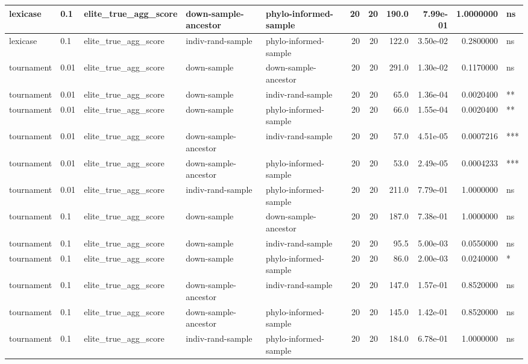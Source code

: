 \documentclass[
]{book}
\begin{document}
\begin{tabular}{l|l|l|l|l|r|r|r|r|r|l}
\hline
lexicase & 0.1 & elite\_true\_agg\_score & down-sample-ancestor & phylo-informed-sample & 20 & 20 & 190.0 & 7.99e-01 & 1.0000000 & ns\\
\hline
lexicase & 0.1 & elite\_true\_agg\_score & indiv-rand-sample & phylo-informed-sample & 20 & 20 & 122.0 & 3.50e-02 & 0.2800000 & ns\\
\hline
tournament & 0.01 & elite\_true\_agg\_score & down-sample & down-sample-ancestor & 20 & 20 & 291.0 & 1.30e-02 & 0.1170000 & ns\\
\hline
tournament & 0.01 & elite\_true\_agg\_score & down-sample & indiv-rand-sample & 20 & 20 & 65.0 & 1.36e-04 & 0.0020400 & **\\
\hline
tournament & 0.01 & elite\_true\_agg\_score & down-sample & phylo-informed-sample & 20 & 20 & 66.0 & 1.55e-04 & 0.0020400 & **\\
\hline
tournament & 0.01 & elite\_true\_agg\_score & down-sample-ancestor & indiv-rand-sample & 20 & 20 & 57.0 & 4.51e-05 & 0.0007216 & ***\\
\hline
tournament & 0.01 & elite\_true\_agg\_score & down-sample-ancestor & phylo-informed-sample & 20 & 20 & 53.0 & 2.49e-05 & 0.0004233 & ***\\
\hline
tournament & 0.01 & elite\_true\_agg\_score & indiv-rand-sample & phylo-informed-sample & 20 & 20 & 211.0 & 7.79e-01 & 1.0000000 & ns\\
\hline
tournament & 0.1 & elite\_true\_agg\_score & down-sample & down-sample-ancestor & 20 & 20 & 187.0 & 7.38e-01 & 1.0000000 & ns\\
\hline
tournament & 0.1 & elite\_true\_agg\_score & down-sample & indiv-rand-sample & 20 & 20 & 95.5 & 5.00e-03 & 0.0550000 & ns\\
\hline
tournament & 0.1 & elite\_true\_agg\_score & down-sample & phylo-informed-sample & 20 & 20 & 86.0 & 2.00e-03 & 0.0240000 & *\\
\hline
tournament & 0.1 & elite\_true\_agg\_score & down-sample-ancestor & indiv-rand-sample & 20 & 20 & 147.0 & 1.57e-01 & 0.8520000 & ns\\
\hline
tournament & 0.1 & elite\_true\_agg\_score & down-sample-ancestor & phylo-informed-sample & 20 & 20 & 145.0 & 1.42e-01 & 0.8520000 & ns\\
\hline
tournament & 0.1 & elite\_true\_agg\_score & indiv-rand-sample & phylo-informed-sample & 20 & 20 & 184.0 & 6.78e-01 & 1.0000000 & ns\\
\hline
\end{tabular}
\end{document}
